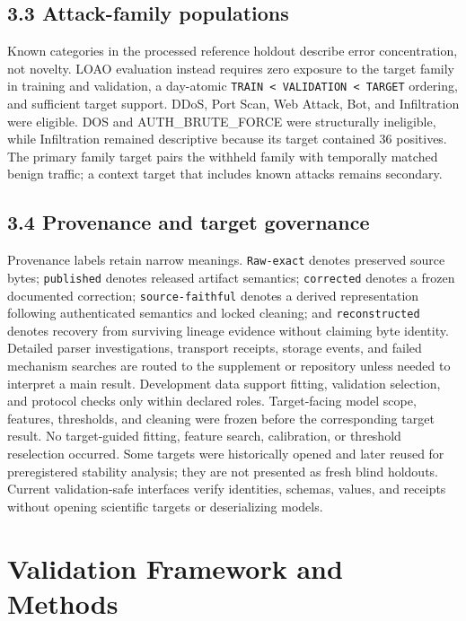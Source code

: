 \documentclass[preprint,12pt]{elsarticle}
\begin{document}
\subsection{3.3 Attack-family populations}
Known categories in the processed reference holdout describe error concentration, not novelty. LOAO evaluation instead requires zero exposure to the target family in training and validation, a day-atomic \texttt{TRAIN < VALIDATION < TARGET} ordering, and sufficient target support. DDoS, Port Scan, Web Attack, Bot, and Infiltration were eligible. DOS and AUTH\_BRUTE\_FORCE were structurally ineligible, while Infiltration remained descriptive because its target contained 36 positives. The primary family target pairs the withheld family with temporally matched benign traffic; a context target that includes known attacks remains secondary.

\subsection{3.4 Provenance and target governance}
Provenance labels retain narrow meanings. \texttt{Raw-exact} denotes preserved source bytes; \texttt{published} denotes released artifact semantics; \texttt{corrected} denotes a frozen documented correction; \texttt{source-faithful} denotes a derived representation following authenticated semantics and locked cleaning; and \texttt{reconstructed} denotes recovery from surviving lineage evidence without claiming byte identity. Detailed parser investigations, transport receipts, storage events, and failed mechanism searches are routed to the supplement or repository unless needed to interpret a main result.
Development data support fitting, validation selection, and protocol checks only within declared roles. Target-facing model scope, features, thresholds, and cleaning were frozen before the corresponding target result. No target-guided fitting, feature search, calibration, or threshold reselection occurred. Some targets were historically opened and later reused for preregistered stability analysis; they are not presented as fresh blind holdouts. Current validation-safe interfaces verify identities, schemas, values, and receipts without opening scientific targets or deserializing models.

\section{Validation Framework and Methods}
\end{document}
